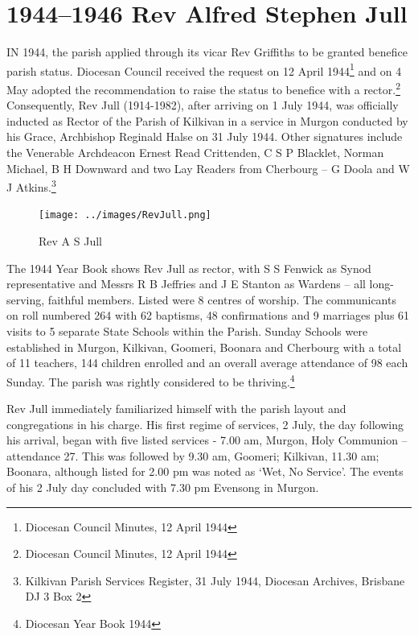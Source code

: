 \balance


\printendnotes[custom]
\setcounter{endnote}{0}
\chapter{1944--1946 Rev Alfred Stephen Jull}
\nobalance


\lettrine[lines=3]{I}{N}
 1944, the parish applied through its vicar Rev Griffiths to be granted benefice parish status. Diocesan Council received the request on 12 April 1944\footnote{Diocesan Council Minutes, 12 April 1944} and on 4 May adopted the recommendation to raise the status to benefice with a rector.\footnote{Diocesan Council Minutes, 12 April 1944} Consequently, Rev Jull (1914-1982), after arriving on 1 July 1944, was officially inducted as Rector of the Parish of Kilkivan in a service in Murgon conducted by his Grace, Archbishop Reginald Halse on 31 July 1944. Other signatures include the Venerable Archdeacon Ernest Read Crittenden, C S P Blacklet, Norman Michael, B H Downward and two Lay Readers from Cherbourg -- G Doola and W J Atkins.\footnote{Kilkivan Parish Services Register, 31 July 1944, Diocesan Archives, Brisbane DJ 3 Box 2}







\begin{figure}
\begin{center}
\texttt{[image: ../images/RevJull.png]}
\caption{Rev A S Jull}
\end{center}
\end{figure}




The 1944 Year Book shows Rev Jull as rector, with S S Fenwick as Synod representative and Messrs R B Jeffries and J E Stanton as Wardens -- all long-serving, faithful members. Listed were 8 centres of worship. The communicants on roll numbered 264 with 62 baptisms, 48 confirmations and 9 marriages plus 61 visits to 5 separate State Schools within the Parish. Sunday Schools were established in Murgon, Kilkivan, Goomeri, Boonara and Cherbourg with a total of 11 teachers, 144 children enrolled and an overall average attendance of 98 each Sunday. The parish was rightly considered to be thriving.\footnote{Diocesan Year Book 1944}


Rev Jull immediately familiarized himself with the parish layout and congregations in his charge. His first regime of services, 2 July, the day following his arrival, began with five listed services - 7.00 am, Murgon, Holy Communion -- attendance 27. This was followed by 9.30 am, Goomeri; Kilkivan, 11.30 am; Boonara, although listed for 2.00 pm was noted as `Wet, No Service'. The events of his 2 July day concluded with 7.30 pm Evensong in Murgon.



